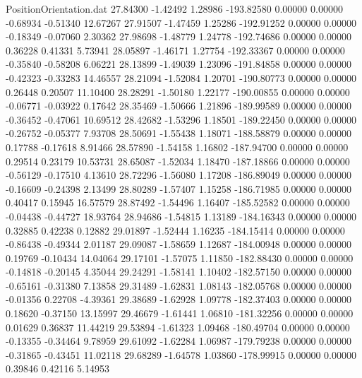 \begin{filecontents}{PositionOrientation.dat}
  27.84300   -1.42492    1.28986  -193.82580    0.00000    0.00000   -0.68934   -0.51340   12.67267
  27.91507   -1.47459    1.25286  -192.91252    0.00000    0.00000   -0.18349   -0.07060    2.30362
  27.98698   -1.48779    1.24778  -192.74686    0.00000    0.00000    0.36228    0.41331    5.73941
  28.05897   -1.46171    1.27754  -192.33367    0.00000    0.00000   -0.35840   -0.58208    6.06221
  28.13899   -1.49039    1.23096  -191.84858    0.00000    0.00000   -0.42323   -0.33283   14.46557
  28.21094   -1.52084    1.20701  -190.80773    0.00000    0.00000    0.26448    0.20507   11.10400
  28.28291   -1.50180    1.22177  -190.00855    0.00000    0.00000   -0.06771   -0.03922    0.17642
  28.35469   -1.50666    1.21896  -189.99589    0.00000    0.00000   -0.36452   -0.47061   10.69512
  28.42682   -1.53296    1.18501  -189.22450    0.00000    0.00000   -0.26752   -0.05377    7.93708
  28.50691   -1.55438    1.18071  -188.58879    0.00000    0.00000    0.17788   -0.17618    8.91466
  28.57890   -1.54158    1.16802  -187.94700    0.00000    0.00000    0.29514    0.23179   10.53731
  28.65087   -1.52034    1.18470  -187.18866    0.00000    0.00000   -0.56129   -0.17510    4.13610
  28.72296   -1.56080    1.17208  -186.89049    0.00000    0.00000   -0.16609   -0.24398    2.13499
  28.80289   -1.57407    1.15258  -186.71985    0.00000    0.00000    0.40417    0.15945   16.57579
  28.87492   -1.54496    1.16407  -185.52582    0.00000    0.00000   -0.04438   -0.44727   18.93764
  28.94686   -1.54815    1.13189  -184.16343    0.00000    0.00000    0.32885    0.42238    0.12882
  29.01897   -1.52444    1.16235  -184.15414    0.00000    0.00000   -0.86438   -0.49344    2.01187
  29.09087   -1.58659    1.12687  -184.00948    0.00000    0.00000    0.19769   -0.10434   14.04064
  29.17101   -1.57075    1.11850  -182.88430    0.00000    0.00000   -0.14818   -0.20145    4.35044
  29.24291   -1.58141    1.10402  -182.57150    0.00000    0.00000   -0.65161   -0.31380    7.13858
  29.31489   -1.62831    1.08143  -182.05768    0.00000    0.00000   -0.01356    0.22708   -4.39361
  29.38689   -1.62928    1.09778  -182.37403    0.00000    0.00000    0.18620   -0.37150   13.15997
  29.46679   -1.61441    1.06810  -181.32256    0.00000    0.00000    0.01629    0.36837   11.44219
  29.53894   -1.61323    1.09468  -180.49704    0.00000    0.00000   -0.13355   -0.34464    9.78959
  29.61092   -1.62284    1.06987  -179.79238    0.00000    0.00000   -0.31865   -0.43451   11.02118
  29.68289   -1.64578    1.03860  -178.99915    0.00000    0.00000    0.39846    0.42116    5.14953

\end{filecontents}
